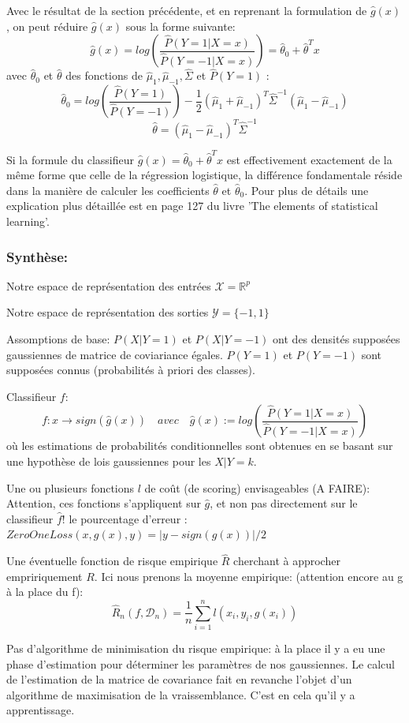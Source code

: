 \documentclass[a4paper]{article}
\theoremstyle{plain}
\begin{document}
Avec le résultat de la section précédente, et en reprenant la formulation de $\hat g(x)$, on peut réduire $\hat g(x)$ sous la forme suivante:
$$\hat g(x) = log(\frac{\hat P(Y=1|X=x)}{\hat P(Y=-1|X=x)}) = \hat \theta_0 + \hat \theta^T x$$
avec $\hat \theta_0$ et $\hat \theta$ des fonctions de $\hat \mu_1, \hat \mu_{-1}, \hat \Sigma$ et $\hat P(Y=1)$ : 
$$ \hat \theta_0 = log(\frac{\hat P(Y=1)}{\hat P(Y=-1)}) -\frac{1}{2}(\hat \mu_1 + \hat \mu_{-1})^T \hat \Sigma^{-1}(\hat \mu_1 - \hat \mu_{-1})$$
$$ \hat \theta = (\hat \mu_1 - \hat \mu_{-1})^T \hat \Sigma^{-1}$$

Si la formule du classifieur $\hat g(x) = \hat \theta_0 + \hat \theta^T x$ est effectivement exactement de la même forme que celle de la régression logistique, la différence fondamentale réside dans la manière de calculer les coefficients $\hat \theta$ et $\hat \theta_0$. Pour plus de détails une explication plus détaillée est en page 127 du livre 'The elements of statistical learning'.

\subsubsection{Synthèse:}

\begin{outline}

\1 Notre espace de représentation des entrées $\mathcal{X} = \mathbb{R}^p$

\1 Notre espace de représentation des sorties $\mathcal{Y}=\{-1,1\}$

\1 Assomptions de base:
\2 $P(X|Y=1)$ et $P(X|Y=-1)$ ont des densités supposées gaussiennes de matrice de coviariance égales.
\2 $P(Y=1)$ et $P(Y=-1)$ sont supposées connus (probabilités à priori des classes).

\1 Classifieur $f$: 
$$f : x \rightarrow sign(\hat g(x)) \quad avec \quad \hat g(x):= log(\frac{\hat P(Y=1|X=x)}{\hat P(Y=-1|X=x)})$$ 
où les estimations de probabilités conditionnelles sont obtenues en se basant sur une hypothèse de lois gaussiennes pour les $X|Y=k$.


\1 Une ou plusieurs fonctions $l$ de coût (de scoring) envisageables (A FAIRE):
\2 Attention, ces fonctions s'appliquent sur $\hat g$, et non pas directement sur le classifieur $\hat f$!
\2 le pourcentage d’erreur : $ZeroOneLoss(x, g(x),y) = |y-sign(g(x))|/2$


\1 Une éventuelle fonction de risque empirique $\hat R$ cherchant à approcher empririquement $R$. Ici nous prenons la moyenne empirique: (attention encore au g à la place du f):
$$\hat R_n(f, \mathcal{D}_n) = \frac{1}{n}\sum_{i=1}^{n}\mathit{l}(x_i,y_i,g(x_i))$$

\1 Pas d'algorithme de minimisation du risque empirique: à la place il y a eu une phase d'estimation pour déterminer les paramètres de nos gaussiennes. Le calcul de l'estimation de la matrice de covariance fait en revanche l'objet d'un algorithme de maximisation de la vraissemblance. C'est en cela qu'il y a apprentissage.

\end{outline}
\end{document}
